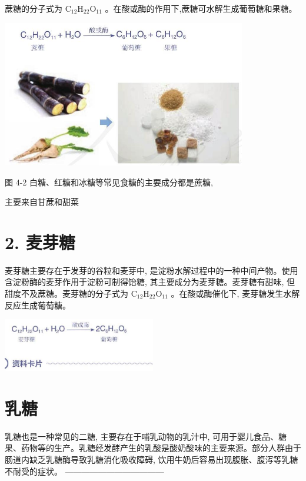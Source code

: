 \documentclass[10pt]{article}
\begin{document}
蔗糖的分子式为 \({\mathrm{C}}_{12}{\mathrm{H}}_{22}{\mathrm{O}}_{11}\) 。在酸或酶的作用下,蔗糖可水解生成葡萄糖和果糖。

\begin{center}
\includegraphics[max width=0.8\textwidth]{images/0190efc5-b58a-7c43-bfb0-e0a030df9cfd_110_936820.jpg}
\end{center}

图 4-2 白糖、红糖和冰糖等常见食糖的主要成分都是蔗糖,

主要来自甘蔗和甜菜

\section*{2. 麦芽糖}

麦芽糖主要存在于发芽的谷粒和麦芽中, 是淀粉水解过程中的一种中间产物。使用含淀粉酶的麦芽作用于淀粉可制得饴糖, 其主要成分为麦芽糖。麦芽糖有甜味, 但甜度不及蔗糖。麦芽糖的分子式为 \({\mathrm{C}}_{12}{\mathrm{H}}_{22}{\mathrm{O}}_{11}\) 。在酸或酶催化下, 麦芽糖发生水解反应生成葡萄糖。

\begin{center}
\includegraphics[max width=0.5\textwidth]{images/0190efc5-b58a-7c43-bfb0-e0a030df9cfd_111_186459.jpg}
\end{center}

\section*{乳糖}

乳糖也是一种常见的二糖, 主要存在于哺乳动物的乳汁中, 可用于婴儿食品、糖果、药物等的生产。乳糖经发酵产生的乳酸是酸奶酸味的主要来源。部分人群由于肠道内缺乏乳糖酶导致乳糖消化吸收障碍, 饮用牛奶后容易出现腹胀、腹泻等乳糖不耐受的症状。 ------------------------------------
\end{document}
